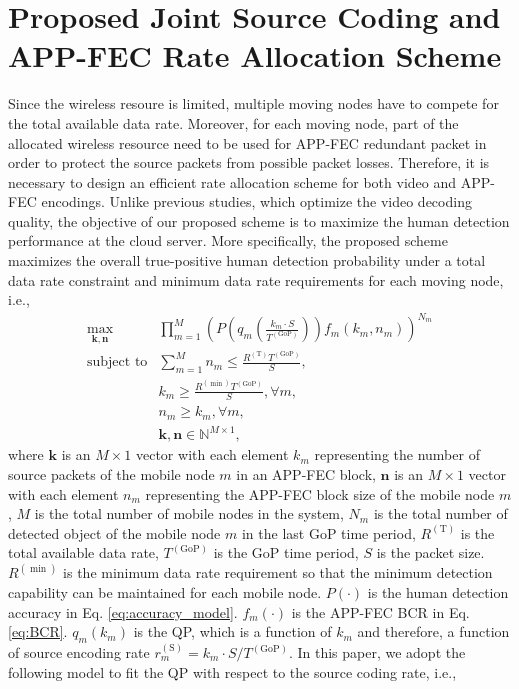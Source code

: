 \documentclass[journal]{IEEEtran}
\begin{document}
\section{Proposed Joint Source Coding and APP-FEC Rate Allocation Scheme}
Since the wireless resoure is limited, multiple moving nodes have to compete for the total available data rate. Moreover, for each moving node, part of the allocated wireless resource need to be used for APP-FEC redundant packet in order to protect the source packets from possible packet losses. Therefore, it is necessary to design an efficient rate allocation scheme for both video and APP-FEC encodings. Unlike previous studies, which optimize the video decoding quality, the objective of our proposed scheme is to maximize the human detection performance at the cloud server. More specifically, the proposed scheme maximizes the overall true-positive human detection probability under a total data rate constraint and minimum data rate requirements for each moving node, i.e.,
\begin{equation}\label{eq:original_probelm}
\begin{array}{rl}
\max_{\mathbf{k,n}}&\prod_{m=1}^{M}\!\!\left(\!\!P\left(q_m\left(\frac{k_m\cdot S}{T^{\left(\text{GoP}\right)}}\right)\right)\!\!f_m\left(k_m,n_m\right)\!\!\right)^{N_m}\\
\text{subject to}&\sum_{m=1}^{M}n_m\leq\frac{R^{\left(\text{T}\right)}T^{\left(\text{GoP}\right)}}{S},\\
& k_m \geq \frac{R^{\left(\min\right)}T^{\left(\text{GoP}\right)}}{S}, \forall m,\\
& n_m \geq k_m, \forall m,\\
& \mathbf{k},\mathbf{n}\in\mathbb{N}^{M\times 1},
\end{array}
\end{equation}
where $\mathbf{k}$ is an $M\times 1$ vector with each element $k_m$ representing the number of source packets of the mobile node $m$ in an APP-FEC block, $\mathbf{n}$ is an $M\times 1$ vector with each element $n_m$ representing the APP-FEC block size of the mobile node $m$, $M$ is the total number of mobile nodes in the system, $N_m$ is the total number of detected object of the mobile node $m$ in the last GoP time period, $R^{\left(\text{T}\right)}$ is the total available data rate, $T^{\left(\text{GoP}\right)}$ is the GoP time period, $S$ is the packet size. $R^{\left(\min\right)}$ is the minimum data rate requirement so that the minimum detection capability can be maintained for each mobile node. $P\left(\cdot\right)$ is the human detection accuracy in Eq. \eqref{eq:accuracy_model}. $f_m\left(\cdot\right)$ is the APP-FEC BCR in Eq. \eqref{eq:BCR}. $q_m\left(k_m\right)$ is the QP, which is a function of $k_m$ and therefore, a function of source encoding rate $r_m^{\left(\text{S}\right)}=k_m\cdot S/T^{\left(\text{GoP}\right)}$. In this paper, we adopt the following model to fit the QP with respect to the source coding rate, i.e.,
\end{document}
